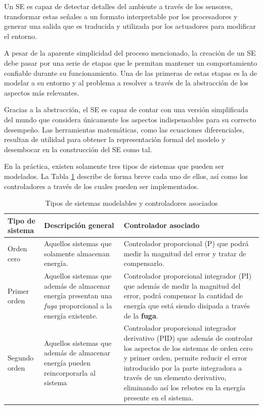 \documentclass[journal]{IEEEtran}
\begin{document}
Un SE es capaz de detectar detalles del ambiente a través de los sensores, transformar estas señales a un formato interpretable por los procesadores y generar una salida que es traducida y utilizada por los actuadores para modificar el entorno.

A pesar de la aparente simplicidad del proceso mencionado, la creación de un SE debe pasar por una serie de etapas que le permitan mantener un comportamiento confiable durante su funcionamiento.
Una de las primeras de estas etapas es la de modelar a su entorno y al problema a resolver a través de la abstracción de los aspectos más relevantes.

Gracias a la abstracción, el SE es capaz de contar con una versión simplificada del mundo que considera únicamente los aspectos indispensables para su correcto desempeño.
Las herramientas matemáticas, como las ecuaciones diferenciales, resultan de utilidad para obtener la representación formal del modelo y desembocar en la construcción del SE como tal.

En la práctica, existen solamente tres tipos de sistemas que pueden ser modelados.
La Tabla \ref{tbl:tipos-sistemas} describe de forma breve cada uno de ellos, así como los controladores a través de los cuales pueden ser implementados.

\begin{table}[!t]
\renewcommand{\arraystretch}{1.3}
\caption{Tipos de sistemas modelables y controladores asociados}
\label{tbl:tipos-sistemas}
\centering
{}
\begin{tabular}{lp{5cm}p{10cm}}
\toprule

Tipo de sistema   & Descripción general & Controlador asociado \\
\midrule

Orden cero &
Aquellos sistemas que solamente almacenan energía. &
Controlador proporcional (P) que podrá medir la magnitud del error y tratar de compensarlo.     \\

Primer orden & 
Aquellos sistemas que además de almacenar energía presentan una \emph{fuga} proporcional a la energía existente. &
Controlador proporcional integrador (PI) que además de medir la magnitud del error, podrá compensar la cantidad de energía que está siendo disipada a través de la \textbf{fuga}.\\

Segundo orden &
Aquellos sistemas que además de almacenar energía pueden reincorporarla al sistema &
Controlador proporcional integrador derivativo (PID) que además de controlar los aspectos de los sistemas de orden cero y primer orden, permite reducir el error introducido por la parte integradora a través de un elemento derivativo, eliminando así los rebotes en la energía presente en el sistema. \\
\bottomrule
\end{tabular}
\end{table}
\end{document}
